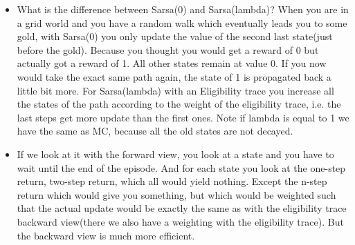 \documentclass[a4paper]{article}
\begin{document}
\begin{itemize}
\item What is the difference between Sarsa(0) and Sarsa(lambda)? When you are in a grid world and you have a random walk which eventually leads you to some gold, with Sarsa(0) you only update the value of the second last state(just before the gold). Because you thought you would get a reward of 0 but actually got a reward of 1. All other states remain at value 0. If you now would take the exact same path again, the state of 1 is propagated back a little bit more. For Sarsa(lambda) with an Eligibility trace you increase all the states of the path according to the weight of the eligibility trace, i.e. the last steps get more update than the first ones. Note if lambda is equal to 1 we have the same as MC, because all the old states are not decayed. 
\item If we look at it with the forward view, you look at a state and you have to wait until the end of the episode. And for each state you look at the one-step return, two-step return, which all would yield nothing. Except the n-step return which would give you something, but which would be weighted such that the actual update would be exactly the same as with the eligibility trace backward view(there we also have a weighting with the eligibility trace). But the backward view is much more efficient.  
\end{itemize}
\end{document}
